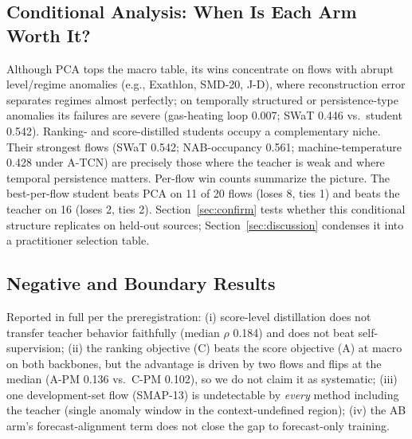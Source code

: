 \subsection{Conditional Analysis: When Is Each Arm Worth It?}\label{sec:dev-conditional}
Although PCA tops the macro table, its wins concentrate on flows with
abrupt level/regime anomalies (e.g., Exathlon, SMD-20, J-D), where
reconstruction error separates regimes almost perfectly; on
temporally structured or persistence-type anomalies its failures are
severe (gas-heating loop 0.007; SWaT 0.446 vs.\ student 0.542).
Ranking- and score-distilled students occupy a complementary niche. Their strongest
flows (SWaT 0.542; NAB-occupancy 0.561; machine-temperature 0.428 under
A-TCN) are precisely those where the teacher is weak and where temporal
persistence matters. Per-flow win counts summarize the picture. The
best-per-flow student beats PCA on 11 of 20 flows (loses 8, ties 1) and
beats the teacher on 16 (loses 2, ties 2). Section~\ref{sec:confirm}
tests whether this conditional structure replicates on held-out sources;
Section~\ref{sec:discussion} condenses it into a practitioner selection
table.

\subsection{Negative and Boundary Results}\label{sec:dev-negative}
Reported in full per the preregistration: (i) score-level distillation
does not transfer teacher behavior faithfully (median $\rho$ 0.184) and
does not beat self-supervision; (ii) the ranking objective (C) beats the
score objective (A) at macro on both backbones, but the advantage is
driven by two flows and flips at the median (A-PM 0.136 vs.\ C-PM 0.102),
so we do not claim it as systematic; (iii) one development-set flow
(SMAP-13) is undetectable by \emph{every} method including the teacher
(single anomaly window in the context-undefined region); (iv) the AB arm's
forecast-alignment term does not close the gap to forecast-only training.
